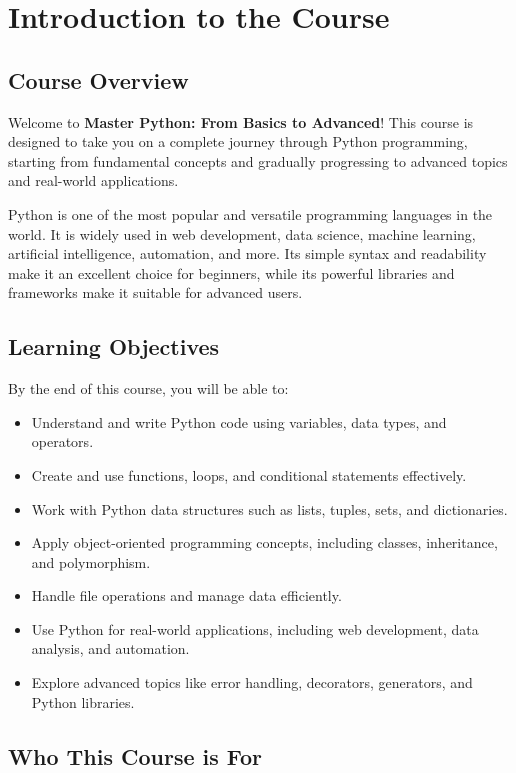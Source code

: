 \chapter{Introduction to the Course}

\section{Course Overview}

Welcome to \textbf{Master Python: From Basics to Advanced}!  
This course is designed to take you on a complete journey through Python programming, starting from fundamental concepts and gradually progressing to advanced topics and real-world applications.

Python is one of the most popular and versatile programming languages in the world. It is widely used in web development, data science, machine learning, artificial intelligence, automation, and more. Its simple syntax and readability make it an excellent choice for beginners, while its powerful libraries and frameworks make it suitable for advanced users.

\section{Learning Objectives}

By the end of this course, you will be able to:

\begin{itemize}
    \item Understand and write Python code using variables, data types, and operators.
    \item Create and use functions, loops, and conditional statements effectively.
    \item Work with Python data structures such as lists, tuples, sets, and dictionaries.
    \item Apply object-oriented programming concepts, including classes, inheritance, and polymorphism.
    \item Handle file operations and manage data efficiently.
    \item Use Python for real-world applications, including web development, data analysis, and automation.
    \item Explore advanced topics like error handling, decorators, generators, and Python libraries.
\end{itemize}


\section{Who This Course is For}

